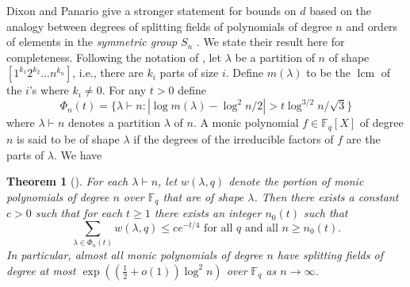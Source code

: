 \documentclass[12pt]{article}
\theoremstyle{plain}
\newtheorem{theorem}{Theorem}
\theoremstyle{definition}
\newcommand{\abs}[1]{\left\vert#1\right\vert}
\DeclareMathOperator{\lcm}{lcm} %
\def\F{\ensuremath{\mathbb{F}}}
\begin{document}
Dixon and Panario \cite{dixon2004degree} give a stronger statement for bounds on $d$ based on the 
analogy between degrees of splitting fields of polynomials of degree $n$ and orders of elements in 
the \textit{symmetric group} $S_n$ \cite{erdos1965some, erdos1967some}. We state their result here 
for completeness. Following the notation of \cite{dixon2004degree}, let $\lambda$ be a partition of 
$n$ of shape $[1^{k_1} 2^{k_2} \dots n^{k_n}]$, i.e., there are $k_i$ parts of size $i$. Define 
$m(\lambda)$ to be the $\lcm$ of the $i$'s where $k_i \ne 0$. For any $t > 0$ define 
\[ \Phi_n(t) = \{ \lambda \vdash n : \abs{\log m(\lambda) - \log^2n / 2} > t\log^{3/2}n / \sqrt{3} 
\} \]
where $\lambda \vdash n$ denotes a partition $\lambda$ of $n$. A monic polynomial $f \in \F_q[X]$ 
of degree $n$ is said to be of shape $\lambda$ if the degrees of the irreducible factors of $f$ are 
the parts of $\lambda$. We have
\begin{theorem}[{\cite[Theorem 1]{dixon2004degree}}]
\label{thm:split-order}
	For each $\lambda \vdash n$, let $w(\lambda, q)$ denote the portion of monic polynomials of 
	degree $n$ over $\F_q$ that are of shape $\lambda$. Then there exists a constant $c > 0$ 
	such that for each $t \ge 1$ there exists an integer $n_0(t)$ such that 
	\[ \sum_{\lambda \in \Phi_n(t)} w(\lambda, q) \le ce^{-t / 4} \text{ for all } q \text{ and all 
	} n \ge n_0(t). \]
	In particular, almost all monic polynomials of degree $n$ have splitting fields of degree at 
	most $\exp((\frac{1}{2} + o(1))\log^2n)$ over $\F_q$ as $n \to \infty$.
\end{theorem}
\end{document}
